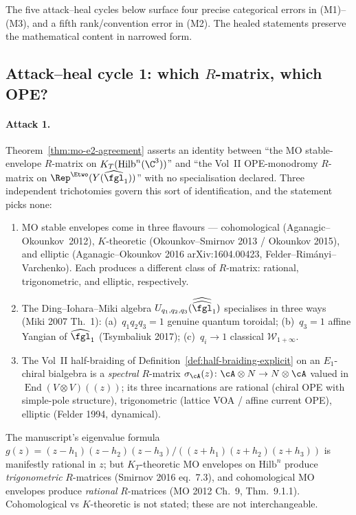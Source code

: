 The five attack--heal cycles below surface four precise categorical
errors in (M1)--(M3), and a fifth rank/convention error in (M2).  The
healed statements preserve the mathematical content in narrowed form.

\subsection*{Attack--heal cycle 1: which $R$-matrix, which OPE?}

\paragraph{Attack 1.}  Theorem~\ref{thm:mo-e2-agreement} asserts
an identity between ``the MO stable-envelope $R$-matrix on
$K_T(\mathrm{Hilb}^n(\C^3))$'' and ``the Vol~II OPE-monodromy
$R$-matrix on $\Rep^{\Etwo}(Y(\widehat{\fgl}_1))$'' with no
specialisation declared.  Three independent trichotomies govern
this sort of identification, and the statement picks none:
\begin{enumerate}[label=\textup{(\roman*)}]
\item MO stable envelopes come in three flavours --- cohomological
(Aganagic--Okounkov~2012), $K$-theoretic (Okounkov--Smirnov 2013 /
Okounkov 2015), and elliptic (Aganagic--Okounkov 2016 arXiv:1604.00423,
Felder--Rim\'anyi--Varchenko).  Each produces a different class of
$R$-matrix: rational, trigonometric, and elliptic, respectively.
\item The Ding--Iohara--Miki algebra $U_{q_1,q_2,q_3}(\widehat{\widehat{\fgl}}_1)$
specialises in three ways (Miki 2007 Th.~1):
(a)~$q_1 q_2 q_3 = 1$ genuine quantum toroidal;
(b)~$q_3 = 1$ affine Yangian of $\widehat{\fgl}_1$ (Tsymbaliuk 2017);
(c)~$q_i \to 1$ classical $\mathcal W_{1+\infty}$.
\item The Vol~II half-braiding of
Definition~\ref{def:half-braiding-explicit} on an
$E_1$-chiral bialgebra is a \emph{spectral} $R$-matrix
$\sigma_\cA(z)\colon\cA\otimes N\to N\otimes\cA$ valued in
$\operatorname{End}(V\otimes V)(\!(z)\!)$; its three incarnations are
rational (chiral OPE with simple-pole structure), trigonometric
(lattice VOA / affine current OPE), elliptic (Felder 1994, dynamical).
\end{enumerate}
The manuscript's eigenvalue formula
$g(z) = (z - h_1)(z - h_2)(z - h_3)/((z + h_1)(z + h_2)(z + h_3))$
is manifestly rational in $z$; but $K_T$-theoretic MO envelopes on
$\mathrm{Hilb}^n$ produce \emph{trigonometric} $R$-matrices (Smirnov
2016 eq.~7.3), and cohomological MO envelopes produce \emph{rational}
$R$-matrices (MO 2012 Ch.~9, Thm.~9.1.1).  Cohomological vs
$K$-theoretic is not stated; these are not interchangeable.

